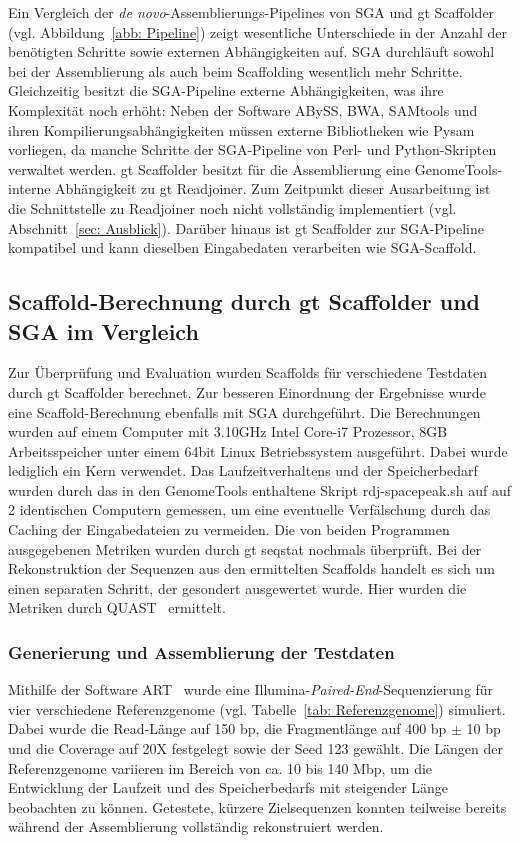 \documentclass[a4paper,11pt,parskip]{scrartcl}
\begin{document}
Ein Vergleich der \textit{de novo}-Assemblierungs-Pipelines von SGA und gt
Scaffolder (vgl. Abbildung~\ref{abb: Pipeline}) zeigt wesentliche Unterschiede
in der Anzahl der benötigten Schritte sowie externen Abhängigkeiten auf.
SGA durchläuft sowohl bei der Assemblierung als auch beim Scaffolding wesentlich
mehr Schritte. Gleichzeitig besitzt die SGA-Pipeline externe Abhängigkeiten,
was ihre Komplexität noch erhöht: Neben der Software ABySS, BWA, SAMtools und
ihren Kompilierungsabhängigkeiten müssen externe Bibliotheken wie Pysam
vorliegen, da manche Schritte der SGA-Pipeline von Perl- und Python-Skripten
verwaltet werden.
gt Scaffolder besitzt für die Assemblierung eine GenomeTools-interne
Abhängigkeit zu gt Readjoiner. Zum Zeitpunkt dieser Ausarbeitung ist die
Schnittstelle zu Readjoiner noch nicht vollständig implementiert
(vgl. Abschnitt~\ref{sec: Ausblick}). Darüber hinaus ist gt Scaffolder zur
SGA-Pipeline kompatibel und kann dieselben Eingabedaten verarbeiten wie
SGA-Scaffold.

\subsection{Scaffold-Berechnung durch gt Scaffolder und SGA im Vergleich}
Zur Überprüfung und Evaluation wurden Scaffolds für verschiedene Testdaten durch
gt Scaffolder berechnet. Zur besseren Einordnung der Ergebnisse wurde eine
Scaffold-Berechnung ebenfalls mit SGA durchgeführt. Die Berechnungen wurden auf
einem Computer mit 3.10GHz Intel Core-i7 Prozessor, 8GB Arbeitsspeicher unter
einem 64bit Linux Betriebssystem ausgeführt. Dabei wurde lediglich ein Kern
verwendet. Das Laufzeitverhaltens und der Speicherbedarf wurden durch das in den
GenomeTools enthaltene Skript rdj-spacepeak.sh auf auf 2 identischen Computern
gemessen, um eine eventuelle Verfälschung durch das
Caching der Eingabedateien zu vermeiden. Die von beiden Programmen ausgegebenen
Metriken wurden durch gt seqstat nochmals überprüft. Bei der
Rekonstruktion der Sequenzen aus den ermittelten Scaffolds handelt es sich um
einen separaten Schritt, der gesondert ausgewertet wurde. Hier wurden die
Metriken durch QUAST~\cite{Gurevich:2013je} ermittelt.

\subsubsection*{Generierung und Assemblierung der Testdaten}
Mithilfe der Software ART~\cite{Huang:2012kq} wurde eine
Illumina-\textit{Paired-End}-Sequenzierung für vier verschiedene Referenzgenome
(vgl. Tabelle~\ref{tab: Referenzgenome}) simuliert. Dabei wurde die Read-Länge
auf 150 bp, die Fragmentlänge auf 400 bp $\pm$ 10 bp und die Coverage auf
20X festgelegt sowie der Seed 123 gewählt. Die Längen der Referenzgenome
variieren im Bereich von ca. 10 bis 140 Mbp, um die Entwicklung der Laufzeit
und des Speicherbedarfs mit steigender Länge beobachten zu können.
Getestete, kürzere Zielsequenzen konnten teilweise bereits während der
Assemblierung vollständig rekonstruiert werden.
\end{document}
